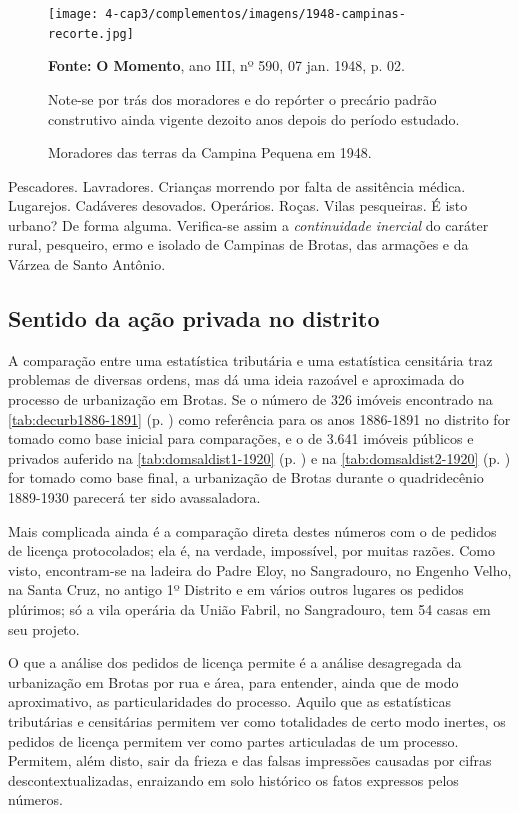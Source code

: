 
\begin{figure}[!htp]
\centering
\caption{Moradores das terras da Campina Pequena em 1948.}
\texttt{[image: 4-cap3/complementos/imagens/1948-campinas-recorte.jpg]}{\par \footnotesize \textbf{Fonte:} \textbf{O Momento}, ano III, nº 590, 07 jan. 1948, p. 02. \par Note-se por trás dos moradores e do repórter o precário padrão construtivo ainda vigente dezoito anos depois do período estudado.}
\label{fig:amaralina1928}
\end{figure}

Pescadores. Lavradores. Crianças morrendo por falta de assitência médica. Lugarejos. Cadáveres desovados. Operários. Roças. Vilas pesqueiras. É isto urbano? De forma alguma. Verifica-se assim a \textit{continuidade inercial} do caráter rural, pesqueiro, ermo e isolado de Campinas de Brotas, das armações e da Várzea de Santo Antônio.

\subsection{Sentido da ação privada no distrito}

A comparação entre uma estatística tributária e uma estatística censitária traz problemas de diversas ordens, mas dá uma ideia razoável e aproximada do processo de urbanização em Brotas. Se o número de 326 imóveis encontrado na \autoref{tab:decurb1886-1891} (p. \pageref{tab:decurb1886-1891}) como referência para os anos 1886-1891 no distrito for tomado como base inicial para comparações, e o de 3.641 imóveis públicos e privados auferido na \autoref{tab:domsaldist1-1920} (p. \pageref{tab:domsaldist1-1920}) e na \autoref{tab:domsaldist2-1920} (p. \pageref{tab:domsaldist2-1920}) for tomado como base final, a urbanização de Brotas durante o quadridecênio 1889-1930 parecerá ter sido avassaladora.

Mais complicada ainda é a comparação direta destes números com o de pedidos de licença protocolados; ela é, na verdade, impossível, por muitas razões. Como visto, encontram-se na ladeira do Padre Eloy, no Sangradouro, no Engenho Velho, na Santa Cruz, no antigo 1º Distrito e em vários outros lugares os pedidos plúrimos; só a vila operária da União Fabril, no Sangradouro, tem 54 casas em seu projeto.

O que a análise dos pedidos de licença permite é a análise desagregada da urbanização em Brotas por rua e área, para entender, ainda que de modo aproximativo, as particularidades do processo. Aquilo que as estatísticas tributárias e censitárias permitem ver como totalidades de certo modo inertes, os pedidos de licença permitem ver como partes articuladas de um processo. Permitem, além disto, sair da frieza e das falsas impressões causadas por cifras descontextualizadas, enraizando em solo histórico os fatos expressos pelos números.

